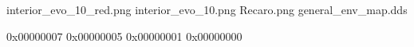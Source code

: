 interior_evo_10_red.png
interior_evo_10.png
Recaro.png
general_env_map.dds


0x00000007
0x00000005
0x00000001
0x00000000